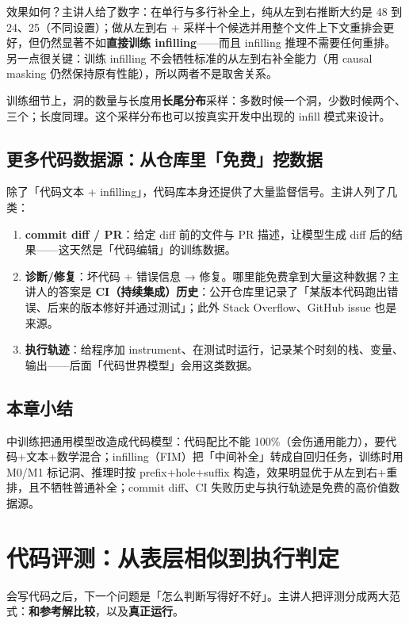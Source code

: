 ﻿\documentclass[a4paper]{article}
\begin{document}
效果如何？主讲人给了数字：在单行与多行补全上，纯从左到右推断大约是 48 到 24、25（不同设置）；做从左到右 + 采样十个候选并用整个文件上下文重排会更好，但仍然显著不如\textbf{直接训练 infilling}——而且 infilling 推理不需要任何重排。另一点很关键：训练 infilling 不会牺牲标准的从左到右补全能力（用 causal masking 仍然保持原有性能），所以两者不是取舍关系。

训练细节上，洞的数量与长度用\textbf{长尾分布}采样：多数时候一个洞，少数时候两个、三个；长度同理。这个采样分布也可以按真实开发中出现的 infill 模式来设计。

\subsection{更多代码数据源：从仓库里「免费」挖数据}

除了「代码文本 + infilling」，代码库本身还提供了大量监督信号。主讲人列了几类：

\begin{enumerate}
\item \textbf{commit diff / PR}：给定 diff 前的文件与 PR 描述，让模型生成 diff 后的结果——这天然是「代码编辑」的训练数据。
\item \textbf{诊断/修复}：坏代码 + 错误信息 → 修复。哪里能免费拿到大量这种数据？主讲人的答案是 \textbf{CI（持续集成）历史}：公开仓库里记录了「某版本代码跑出错误、后来的版本修好并通过测试」；此外 Stack Overflow、GitHub issue 也是来源。
\item \textbf{执行轨迹}：给程序加 instrument、在测试时运行，记录某个时刻的栈、变量、输出——后面「代码世界模型」会用这类数据。
\end{enumerate}

\subsection{本章小结}
中训练把通用模型改造成代码模型：代码配比不能 100\%（会伤通用能力），要代码+文本+数学混合；infilling（FIM）把「中间补全」转成自回归任务，训练时用 M0/M1 标记洞、推理时按 prefix+hole+suffix 构造，效果明显优于从左到右+重排，且不牺牲普通补全；commit diff、CI 失败历史与执行轨迹是免费的高价值数据源。

\section{代码评测：从表层相似到执行判定}

会写代码之后，下一个问题是「怎么判断写得好不好」。主讲人把评测分成两大范式：\textbf{和参考解比较}，以及\textbf{真正运行}。
\end{document}

